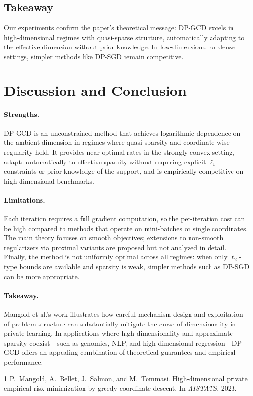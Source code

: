 \documentclass[11pt,a4paper]{article}
\begin{document}
\subsection{Takeaway}

Our experiments confirm the paper's theoretical message: DP-GCD excels in high-dimensional regimes with quasi-sparse structure, automatically adapting to the effective dimension without prior knowledge. In low-dimensional or dense settings, simpler methods like DP-SGD remain competitive.

\section{Discussion and Conclusion}

\paragraph{Strengths.}
DP-GCD is an unconstrained method that achieves logarithmic dependence on the ambient dimension in regimes where quasi-sparsity and coordinate-wise regularity hold. It provides near-optimal rates in the strongly convex setting, adapts automatically to effective sparsity without requiring explicit $\ell_1$ constraints or prior knowledge of the support, and is empirically competitive on high-dimensional benchmarks.

\paragraph{Limitations.}
Each iteration requires a full gradient computation, so the per-iteration cost can be high compared to methods that operate on mini-batches or single coordinates. The main theory focuses on smooth objectives; extensions to non-smooth regularizers via proximal variants are proposed but not analyzed in detail. Finally, the method is not uniformly optimal across all regimes: when only $\ell_2$-type bounds are available and sparsity is weak, simpler methods such as DP-SGD can be more appropriate.

\paragraph{Takeaway.}
Mangold et al.'s work illustrates how careful mechanism design and exploitation of problem structure can substantially mitigate the curse of dimensionality in private learning. In applications where high dimensionality and approximate sparsity coexist—such as genomics, NLP, and high-dimensional regression—DP-GCD offers an appealing combination of theoretical guarantees and empirical performance.

\begin{thebibliography}{1}
P.~Mangold, A.~Bellet, J.~Salmon, and M.~Tommasi.
\newblock High-dimensional private empirical risk minimization by greedy
  coordinate descent.
\newblock In \emph{AISTATS}, 2023.
\end{thebibliography}
\end{document}
